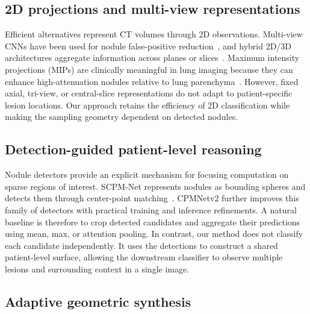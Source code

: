 \documentclass[preprint,12pt]{elsarticle}
\begin{document}
\subsection{2D projections and multi-view representations}

Efficient alternatives represent CT volumes through 2D observations. Multi-view CNNs have been used for nodule false-positive reduction~\cite{setio2016multiview}, and hybrid 2D/3D architectures aggregate information across planes or slices~\cite{jang2022m3t}. Maximum intensity projections (MIPs) are clinically meaningful in lung imaging because they can enhance high-attenuation nodules relative to lung parenchyma~\cite{zheng2020mip}. However, fixed axial, tri-view, or central-slice representations do not adapt to patient-specific lesion locations. Our approach retains the efficiency of 2D classification while making the sampling geometry dependent on detected nodules.

\subsection{Detection-guided patient-level reasoning}

Nodule detectors provide an explicit mechanism for focusing computation on sparse regions of interest. SCPM-Net represents nodules as bounding spheres and detects them through center-point matching~\cite{luo2022scpmnet}. CPMNetv2 further improves this family of detectors with practical training and inference refinements. A natural baseline is therefore to crop detected candidates and aggregate their predictions using mean, max, or attention pooling. In contrast, our method does not classify each candidate independently. It uses the detections to construct a shared patient-level surface, allowing the downstream classifier to observe multiple lesions and surrounding context in a single image.

\subsection{Adaptive geometric synthesis}
\end{document}
